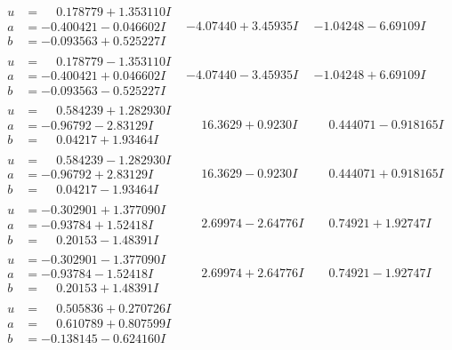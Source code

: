 \documentclass[1p]{elsarticle_modified}
\theoremstyle{definition}
\begin{document}
$$\begin{array}{c|c|c}
\begin{aligned}
u &= \phantom{-}0.178779 + 1.353110 I \\
a &= -0.400421 - 0.046602 I \\
b &= -0.093563 + 0.525227 I\end{aligned}
 & -4.07440 + 3.45935 I & -1.04248 - 6.69109 I \\ \hline\begin{aligned}
u &= \phantom{-}0.178779 - 1.353110 I \\
a &= -0.400421 + 0.046602 I \\
b &= -0.093563 - 0.525227 I\end{aligned}
 & -4.07440 - 3.45935 I & -1.04248 + 6.69109 I \\ \hline\begin{aligned}
u &= \phantom{-}0.584239 + 1.282930 I \\
a &= -0.96792 - 2.83129 I \\
b &= \phantom{-}0.04217 + 1.93464 I\end{aligned}
 & \phantom{-}16.3629 + 0.9230 I & \phantom{-}0.444071 - 0.918165 I \\ \hline\begin{aligned}
u &= \phantom{-}0.584239 - 1.282930 I \\
a &= -0.96792 + 2.83129 I \\
b &= \phantom{-}0.04217 - 1.93464 I\end{aligned}
 & \phantom{-}16.3629 - 0.9230 I & \phantom{-}0.444071 + 0.918165 I \\ \hline\begin{aligned}
u &= -0.302901 + 1.377090 I \\
a &= -0.93784 + 1.52418 I \\
b &= \phantom{-}0.20153 - 1.48391 I\end{aligned}
 & \phantom{-}2.69974 - 2.64776 I & \phantom{-}0.74921 + 1.92747 I \\ \hline\begin{aligned}
u &= -0.302901 - 1.377090 I \\
a &= -0.93784 - 1.52418 I \\
b &= \phantom{-}0.20153 + 1.48391 I\end{aligned}
 & \phantom{-}2.69974 + 2.64776 I & \phantom{-}0.74921 - 1.92747 I \\ \hline\begin{aligned}
u &= \phantom{-}0.505836 + 0.270726 I \\
a &= \phantom{-}0.610789 + 0.807599 I \\
b &= -0.138145 - 0.624160 I\end{aligned}

\end{array}$$
\end{document}
